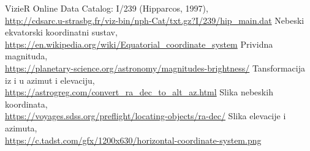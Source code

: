 \begin{thebibliography}{9}
    VizieR Online Data Catalog: I/239 (Hipparcos, 1997),\\
    \url{http://cdsarc.u-strasbg.fr/viz-bin/nph-Cat/txt.gz?I/239/hip\_main.dat}
    Nebeski ekvatorski koordinatni sustav,  \\
    \url{https://en.wikipedia.org/wiki/Equatorial_coordinate_system}
    Prividna magnituda, \\
    \url{https://planetary-science.org/astronomy/magnitudes-brightness/}
    Tansformacija iz  i  u azimut i elevaciju, \\
    \url{https://astrogreg.com/convert_ra_dec_to_alt_az.html}
    Slika nebeskih koordinata, \\
    \url{https://voyages.sdss.org/preflight/locating-objects/ra-dec/}
    Slika elevacije i azimuta, \\
    \url{https://c.tadst.com/gfx/1200x630/horizontal-coordinate-system.png}

\end{thebibliography}

